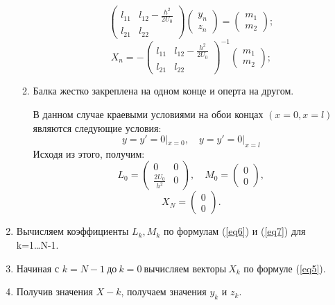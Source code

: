 \begin{enumerate}
\begin{enumerate}
\begin{equation*}
			\end{equation*}
			\begin{equation*}
			\left(\begin{matrix}l_{11}&l_{12}-\frac{h^2}{2U_0}\\l_{21}&l_{22}\end{matrix}\right)\left(\begin{matrix}y_n\\z_n\end{matrix}\right)=\left(\begin{matrix}m_1\\m_2\end{matrix}\right);
			\end{equation*}
			\begin{equation*}
			X_n=-\left(\begin{matrix}l_{11}&l_{12}-\frac{h^2}{2U_0}\\l_{21}&l_{22}\end{matrix}\right)^{-1}\left(\begin{matrix}m_1\\m_2\end{matrix}\right);
			\end{equation*}
			\item Балка жестко закреплена на одном конце и оперта на другом.
					
			В данном случае краевыми условиями на обои концах \((x=0,x=l)\) являются следующие условия:
			\begin{equation*}
			y=y'=0|_{x=0}, \quad y=y'=0|_{x=l}
			\end{equation*}
			Исходя из этого, получим:
			\begin{equation*}
			L_0=\left( \begin{matrix}0&0\\\frac{2U_0}{h^2}&0\end{matrix} \right),\quad
			M_0=\left( \begin{matrix}0\\0\end{matrix} \right),
			\end{equation*}
			\begin{equation*}
			X_N=\left( \begin{matrix}0\\0\end{matrix} \right).
			\end{equation*}
		\end{enumerate}
		\item Вычисляем  коэффициенты \(L_k,M_k\) по формулам (\ref{eq6}) и (\ref{eq7}) для\\ k=1\ldots N-1.
		\item Начиная с \(k=N-1~\text{до}~k=0~\text{вычисляем векторы}~X_k\) по формуле (\ref{eq5}). 
		\item Получив значения \(X-k\), получаем значения \(y_k\text{ и } z_k\).
	\end{enumerate}
